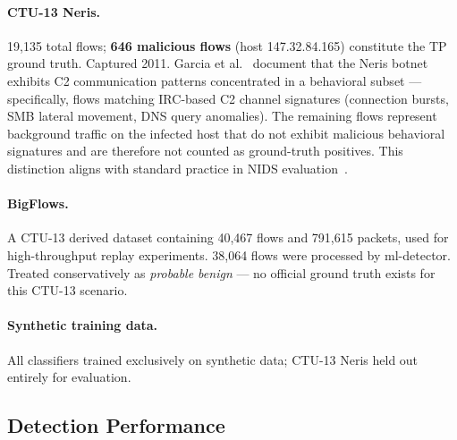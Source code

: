 \documentclass[11pt,a4paper]{article}
\begin{document}
    \paragraph{CTU-13 Neris.}
    19,135 total flows; \textbf{646 malicious flows} (host 147.32.84.165) constitute the TP
    ground truth. Captured 2011. Garcia et al.~\cite{garcia2014} document that the Neris botnet
    exhibits C2 communication patterns concentrated in a behavioral subset --- specifically,
    flows matching IRC-based C2 channel signatures (connection bursts, SMB lateral movement, DNS
    query anomalies). The remaining flows represent background traffic on the infected host that
    do not exhibit malicious behavioral signatures and are therefore not counted as ground-truth
    positives. This distinction aligns with standard practice in NIDS
    evaluation~\cite{sharafaldin2018,mirsky2018}.

    \paragraph{BigFlows.}
    A CTU-13 derived dataset containing 40,467 flows and 791,615 packets, used for high-throughput
    replay experiments. 38,064 flows were processed by ml-detector. Treated conservatively as
    \emph{probable benign} --- no official ground truth exists for this CTU-13 scenario.

    \paragraph{Synthetic training data.}
    All classifiers trained exclusively on synthetic data; CTU-13 Neris held out entirely for
    evaluation.

    \subsection{Detection Performance}
\end{document}
